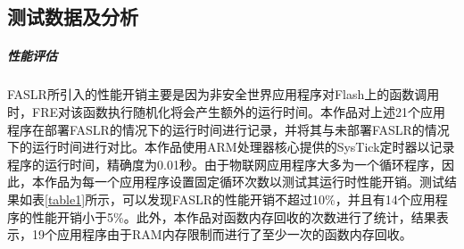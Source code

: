 \documentclass[UTF8,12pt,a4paper,twoside]{ctexart}
\numberwithin{figure}{section}
\begin{document}
\subsection{测试数据及分析}

\subparagraph{性能评估}
\par FASLR所引入的性能开销主要是因为非安全世界应用程序对Flash上的函数调用时，FRE对该函数执行随机化将会产生额外的运行时间。本作品对上述21个应用程序在部署FASLR的情况下的运行时间进行记录，并将其与未部署FASLR的情况下的运行时间进行对比。本作品使用ARM处理器核心提供的SysTick定时器以记录程序的运行时间，精确度为0.01秒。由于物联网应用程序大多为一个循环程序，因此，本作品为每一个应用程序设置固定循环次数以测试其运行时性能开销。测试结果如表\ref{table1}所示，可以发现FASLR的性能开销不超过10\%，并且有14个应用程序的性能开销小于5\%。此外，本作品对函数内存回收的次数进行了统计，结果表示，19个应用程序由于RAM内存限制而进行了至少一次的函数内存回收。
\end{document}
